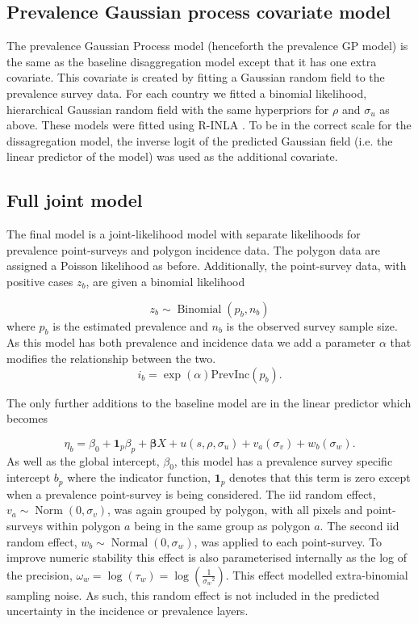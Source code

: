 \documentclass{statsoc}
\begin{document}
\subsection*{Prevalence Gaussian process covariate model}

The prevalence Gaussian Process model (henceforth the prevalence GP model) is the same as the baseline disaggregation model except that it has one extra covariate.
This covariate is created by fitting a Gaussian random field to the prevalence survey data.
For each country we fitted a binomial likelihood, hierarchical Gaussian random field with the same hyperpriors for $\rho$ and $\sigma_u$ as above.
These models were fitted using R-INLA \citep{INLA}.
To be in the correct scale for the dissagregation model, the inverse logit of the predicted Gaussian field (i.e. the linear predictor of the model) was used as the additional covariate.

\subsection*{Full joint model}

The final model is a joint-likelihood model with separate likelihoods for prevalence point-surveys and polygon incidence data.
The polygon data are assigned a Poisson likelihood as before.
Additionally, the point-survey data, with positive cases $z_b$, are given a binomial likelihood

$$z_b \sim \operatorname{Binomial}(p_b, n_b) $$
where $p_b$ is the estimated prevalence and $n_b$ is the observed survey sample size. 
As this model has both prevalence and incidence data we add a parameter $\alpha$ that modifies the relationship between the two.
$$i_b = \exp(\alpha)\mathrm{PrevInc}(p_b).$$

The only further additions to the baseline model are in the linear predictor which becomes 

$$\eta_b = \beta_0 + \mathbf{1}_p\beta_p +  \boldsymbol\beta X  + u(s, \rho, \sigma_u) + v_a(\sigma_v) + w_b(\sigma_w).$$
As well as the global intercept, $\beta_0$, this model has a prevalence survey specific intercept $b_p$ where the indicator function, $\mathbf{1}_p$ denotes that this term is zero except when a prevalence point-survey is being considered.
The iid random effect, $v_a \sim \operatorname{Norm}(0, \sigma_v)$, was again grouped by polygon, with all pixels and point-surveys within polygon $a$ being in the same group as polygon $a$.
The second iid random effect, $w_b \sim \operatorname{Normal}(0, \sigma_w)$, was applied to each point-survey.
To improve numeric stability this effect is also parameterised internally as the log of the precision, $\omega_w = \log(\tau_w) = \log(\frac{1}{{\sigma_w}^2})$.
This effect modelled extra-binomial sampling noise.
As such, this random effect is not included in the predicted uncertainty in the incidence or prevalence layers.
\end{document}
